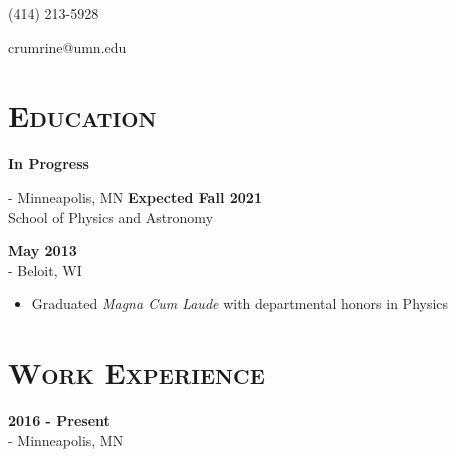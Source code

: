 \documentclass[10pt]{article}
\author{Michael Crumrine}
\begin{document}
 

\nocite{*}

\noindent(414) 213-5928

\noindent crumrine@umn.edu

\section*{\Large{\textsc{Education}}}
\vspace*{-1.5em}
\hrulefill

	 \hspace{\fill} {\bf In Progress}
	
	 - Minneapolis, MN \hspace{\fill} {\bf Expected Fall 2021}\\
	\noindent School of Physics and Astronomy 
	\vspace{0.125in}
	
	 \hspace{\fill} {\bf May 2013}  \\
	 - Beloit, WI
	
	\begin{itemize}[noitemsep,topsep=0pt]
		\item{Graduated \textit{Magna Cum Laude} with departmental honors in Physics}
	\end{itemize}


\section*{\Large{\textsc{Work Experience}}}
\vspace*{-1.5em}
\hrulefill

	 \hspace{\fill} {\bf 2016 - Present}  \\
	 - Minneapolis, MN
	
\end{document}
